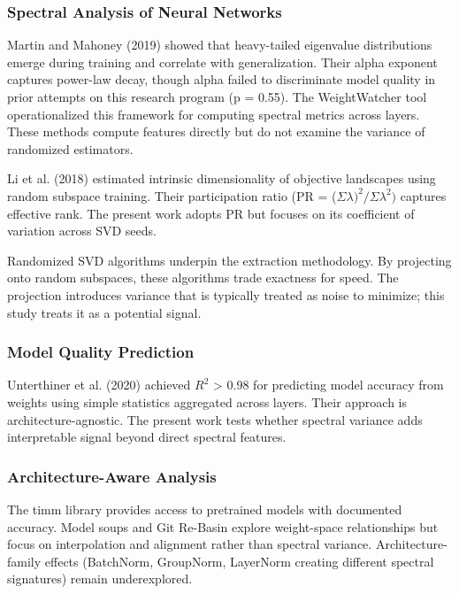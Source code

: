 
\subsubsection{Spectral Analysis of Neural Networks}

Martin and Mahoney (2019) showed that heavy-tailed eigenvalue distributions emerge during training and correlate with generalization. Their alpha exponent captures power-law decay, though alpha failed to discriminate model quality in prior attempts on this research program (p = 0.55). The WeightWatcher tool \citep{Martin2021WeightWatcher} operationalized this framework for computing spectral metrics across layers. These methods compute features directly but do not examine the variance of randomized estimators.

Li et al. (2018) estimated intrinsic dimensionality of objective landscapes using random subspace training. Their participation ratio (PR = ($\Sigma \lambda )^2 / \Sigma \lambda ^{2})$ captures effective rank. The present work adopts PR but focuses on its coefficient of variation across SVD seeds.

Randomized SVD algorithms \citep{Halko2011Finding} underpin the extraction methodology. By projecting onto random subspaces, these algorithms trade exactness for speed. The projection introduces variance that is typically treated as noise to minimize; this study treats it as a potential signal.

\subsubsection{Model Quality Prediction}

Unterthiner et al. (2020) achieved $R^2$ > 0.98 for predicting model accuracy from weights using simple statistics aggregated across layers. Their approach is architecture-agnostic. The present work tests whether spectral variance adds interpretable signal beyond direct spectral features.

\subsubsection{Architecture-Aware Analysis}

The timm library \citep{Wightman2019timm} provides access to pretrained models with documented accuracy. Model soups \citep{Wortsman2022ModelSoups} and Git Re-Basin \citep{Ainsworth2023GitReBasin} explore weight-space relationships but focus on interpolation and alignment rather than spectral variance. Architecture-family effects (BatchNorm, GroupNorm, LayerNorm creating different spectral signatures) remain underexplored.
